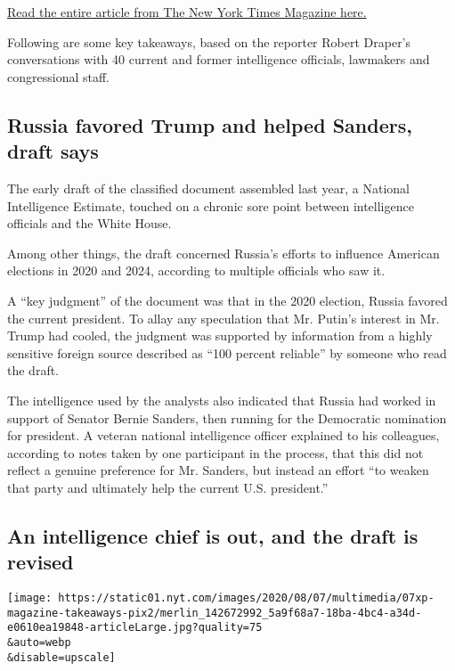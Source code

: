\href{https://www.nytimes.com/2020/08/08/magazine/us-russia-intelligence.html}{Read
the entire article from The New York Times Magazine here.}

Following are some key takeaways, based on the reporter Robert Draper's
conversations with 40 current and former intelligence officials,
lawmakers and congressional staff.

\hypertarget{russia-favored-trump-and-helped-sanders-draft-says}{%
\subsection{Russia favored Trump and helped Sanders, draft
says}\label{russia-favored-trump-and-helped-sanders-draft-says}}

The early draft of the classified document assembled last year, a
National Intelligence Estimate, touched on a chronic sore point between
intelligence officials and the White House.

Among other things, the draft concerned Russia's efforts to influence
American elections in 2020 and 2024, according to multiple officials who
saw it.

A ``key judgment'' of the document was that in the 2020 election, Russia
favored the current president. To allay any speculation that Mr. Putin's
interest in Mr. Trump had cooled, the judgment was supported by
information from a highly sensitive foreign source described as ``100
percent reliable'' by someone who read the draft.

The intelligence used by the analysts also indicated that Russia had
worked in support of Senator Bernie Sanders, then running for the
Democratic nomination for president. A veteran national intelligence
officer explained to his colleagues, according to notes taken by one
participant in the process, that this did not reflect a genuine
preference for Mr. Sanders, but instead an effort ``to weaken that party
and ultimately help the current U.S. president.''

\hypertarget{an-intelligence-chief-is-out-and-the-draft-is-revised}{%
\subsection{An intelligence chief is out, and the draft is
revised}\label{an-intelligence-chief-is-out-and-the-draft-is-revised}}

\texttt{[image: https://static01.nyt.com/images/2020/08/07/multimedia/07xp-magazine-takeaways-pix2/merlin\_142672992\_5a9f68a7-18ba-4bc4-a34d-e0610ea19848-articleLarge.jpg?quality=75\\\&auto=webp\\\&disable=upscale]}

